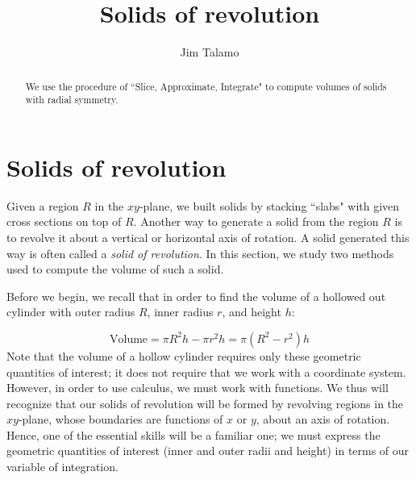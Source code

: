 \documentclass{ximera}
\author{Jim Talamo}
\title[Dig-In:]{Solids of revolution}
\begin{document}
\begin{abstract}
  We use the procedure of ``Slice, Approximate, Integrate" to compute volumes of solids with radial symmetry.
\end{abstract}
\maketitle


\section{Solids of revolution}

Given a region $R$ in the $xy$-plane, we built solids by stacking ``slabs" with given cross sections on top of $R$.  Another way to generate a solid from the region $R$ is to revolve it about a vertical or horizontal axis of rotation.  A solid generated this way is often called a \emph{solid of revolution}. In this section, we study two methods used to compute the volume of such a solid.

Before we begin, we recall that in order to find the volume of a hollowed out cylinder with outer radius $R$, inner radius $r$, and height $h$:

\begin{image}
\end{image}


\[
\textrm{Volume} = \pi R^2h-\pi r^2h=\pi(R^2-r^2)h 
\]
Note that the volume of a hollow cylinder requires only these geometric quantities of interest; it does not require that we work with a coordinate system.  However, in order to use calculus, we must work with functions.  We thus will recognize that our solids of revolution will be formed by revolving regions in the $xy$-plane, whose boundaries are functions of $x$ or $y$, about an axis of rotation.  Hence, one of the essential skills will be a familiar one; we must express the geometric quantities of interest (inner and outer radii and height) in terms of our variable of integration.
\end{document}
